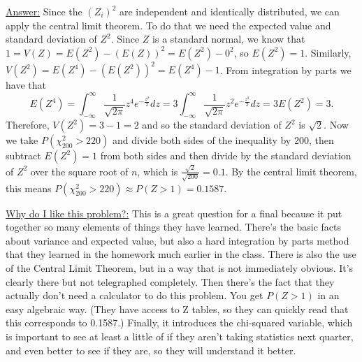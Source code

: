 \documentclass[12pt]{article}
\begin{document}
\begin{enumerate}
\underline{Answer:} Since the $(Z_i)^2$ are independent and identically distributed, we can apply the central limit theorem. To do that we need the expected value and standard deviation of $Z^2$. Since $Z$ is a standard normal, we know that $1=V(Z)=E(Z^2)-(E(Z))^2 = E(Z^2) - 0^2$, so $E(Z^2)=1$.  Similarly, $V(Z^2) = E(Z^4) - (E(Z^2))^2 = E(Z^4) - 1$. From integration by parts we have that 
$$E(Z^4)= \int_{-\infty}^{\infty} \frac{1}{\sqrt{2\pi}} z^4 e^{-\frac{z^2}{2}}dz = 3 \int_{-\infty}^{\infty} \frac{1}{\sqrt{2\pi}} z^2 e^{-\frac{z^2}{2}} dz= 3E(Z^2) = 3.$$
Therefore, $V(Z^2)=3-1=2$ and so the standard deviation of $Z^2$ is $\sqrt{2}$. Now we take $P(\chi _{200}^{2}>220)$ and divide both sides of the inequality by 200, then subtract $E(Z^2)=1$ from both sides and then divide by the standard deviation of $Z^2$ over the square root of $n$, which is $\frac{\sqrt{2}}{\sqrt{200}}=0.1$. By the central limit theorem, this means $P(\chi _{200}^{2}>220) \approx P(Z>1)=0.1587.$ 

\underline{Why do I like this problem?:}  This is a great question for a final because it put together so many elements of things they have learned. There's the basic facts about variance and expected value, but also a hard integration by parts method that they learned in the homework much earlier in the class. There is also the use of the Central Limit Theorem, but in a way that is not immediately obvious. It's clearly there but not telegraphed completely. Then there's the fact that they actually don't need a calculator to do this problem. You get $P(Z>1)$ in an easy algebraic way. (They have access to Z tables, so they can quickly read that this corresponds to 0.1587.) Finally, it introduces the chi-squared variable, which is important to see at least a little of if they aren't taking statistics next quarter, and even better to see if they are, so they will understand it better.

\end{enumerate}
\end{document}
